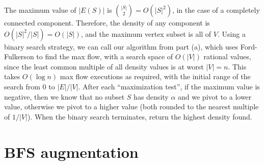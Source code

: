 \documentclass[12pt]{article}
\begin{document}
\begin{enumerate}
The maximum value of $|E(S)|$ is $\binom{|S|}{2} = O(|S|^2)$,
in the case of a completely
connected component. Therefore, the density of any component is
$O(|S|^2/|S|) = O(|S|)$, and the maximum vertex subset is all of
$V$.
Using a binary search strategy, we can call our algorithm from part (a),
which uses Ford-Fulkerson to find the max flow,
with a search space of $O(|V|)$ rational values,
since the least common multiple of all density values is at worst $|V| = n$.
This takes $O(\log{n})$ max flow executions as required,
with the initial range of the
search from $0$ to $|E|/|V|$.
After each ``maximization test'', if
the maximum value is negative, then we know that no subset $S$
has density $\alpha$ and we pivot to a lower value, otherwise we pivot
to a higher value (both rounded to the nearest multiple of $1/|V|$).
When the binary search terminates, return the highest density found.

\end{enumerate}
\pagebreak

\section{BFS augmentation}
\end{document}
